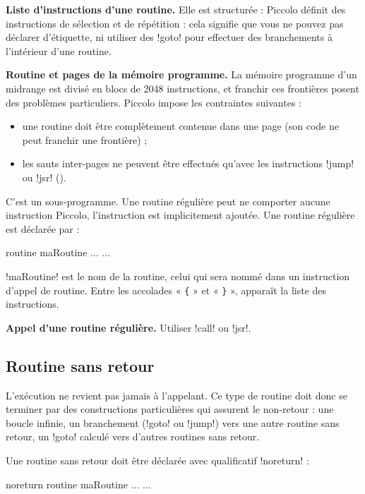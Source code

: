 \textbf{Liste d’instructions d’une routine.} Elle est structurée : Piccolo définit des instructions de sélection et de répétition : cela signifie que vous ne pouvez pas déclarer d’étiquette, ni utiliser des \pic!goto! pour effectuer des branchements à l’intérieur d’une routine.

\textbf{Routine et pages de la mémoire programme.} La mémoire programme d’un midrange est divisé en blocs de 2048 instructions, et franchir ces frontières posent des problèmes particuliers. Piccolo impose les contraintes suivantes :\begin{itemize}
  \item une routine doit être complètement contenue dans une page (son code ne peut franchir une frontière) ;
  \item les sauts inter-pages ne peuvent être effectués qu’avec les instructions \pic!jump! ou \pic!jsr! ().
\end{itemize}


C'est un sous-programme. Une routine régulière peut ne comporter aucune instruction Piccolo, l'instruction  est implicitement ajoutée. Une routine régulière est déclarée par :
\begin{piccolo}
routine maRoutine ... {
  ...
}
\end{piccolo}

\pic!maRoutine! est le nom de la routine, celui qui sera nommé dans un instruction d’appel de routine. Entre les accolades « \texttt{\{} » et « \texttt{\}} », apparaît la liste des instructions.

\textbf{Appel d’une routine régulière.} Utiliser \pic!call! ou \pic!jsr!.

\subsection{Routine sans retour}

L’exécution ne revient pas jamais à l’appelant. Ce type de routine doit donc se terminer par des constructions particulières qui assurent le non-retour : une boucle infinie, un branchement (\pic!goto! ou \pic!jump!) vers une autre routine sans retour, un \pic!goto! calculé vers d’autres routines sans retour.

Une routine sans retour doit être déclarée avec qualificatif \pic!noreturn! :
\begin{piccolo}
noreturn routine maRoutine ... {
  ...
}
\end{piccolo}

